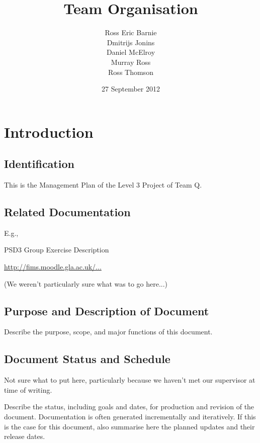 \documentclass{l3deliverable}
\title{Team Organisation}
\author{
  Ross Eric Barnie \\
  Dmitrijs Jonins \\
  Daniel McElroy \\
  Murray Ross \\
  Ross Thomson
}
\date{27 September 2012}
\begin{document}

\maketitle


\section{Introduction}

\subsection{Identification}

This is the Management Plan of the Level 3 Project of Team Q.

\subsection{Related Documentation}

E.g.,
\begin{list}{}{}
\item PSD3 Group Exercise Description \
  
  \url{http://fims.moodle.gla.ac.uk/...}
\item (We weren't particularly sure what was to go here...)
\end{list}
 

\subsection{Purpose and Description of Document}
Describe the purpose, scope, and major functions of this document.

\subsection{Document Status and Schedule}

Not sure what to put here, particularly because we haven't met our supervisor 
at time of writing.

Describe the status, including goals and dates, for production and
revision of the document.  Documentation is often generated
incrementally and iteratively. If this is the case for this document,
also summarise here the planned updates and their release dates.
\end{document}

